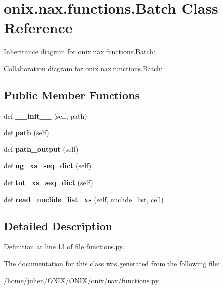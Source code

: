 \hypertarget{classonix_1_1nax_1_1functions_1_1Batch}{}\section{onix.\+nax.\+functions.\+Batch Class Reference}
\label{classonix_1_1nax_1_1functions_1_1Batch}


Inheritance diagram for onix.\+nax.\+functions.\+Batch\+:


Collaboration diagram for onix.\+nax.\+functions.\+Batch\+:
\subsection*{Public Member Functions}
\begin{DoxyCompactItemize}
\item 
\mbox{\label{classonix_1_1nax_1_1functions_1_1Batch_a2a2721defa48518e24878facf886f67f}} 
def {\bfseries \+\_\+\+\_\+init\+\_\+\+\_\+} (self, path)
\item 
\mbox{\label{classonix_1_1nax_1_1functions_1_1Batch_a829a10990e29090bd7cd8485b3ce2eda}} 
def {\bfseries path} (self)
\item 
\mbox{\label{classonix_1_1nax_1_1functions_1_1Batch_aacec11e49b4036af99737872572e4a45}} 
def {\bfseries path\+\_\+output} (self)
\item 
\mbox{\label{classonix_1_1nax_1_1functions_1_1Batch_aca18dd2dcf6c22e79243119543ea36ec}} 
def {\bfseries ng\+\_\+xs\+\_\+seq\+\_\+dict} (self)
\item 
\mbox{\label{classonix_1_1nax_1_1functions_1_1Batch_af8db5813a30a758662f47bc3d6b26116}} 
def {\bfseries tot\+\_\+xs\+\_\+seq\+\_\+dict} (self)
\item 
\mbox{\label{classonix_1_1nax_1_1functions_1_1Batch_ac823f6baced7adea781ae6940b7d22c5}} 
def {\bfseries read\+\_\+nuclide\+\_\+list\+\_\+xs} (self, nuclide\+\_\+list, cell)
\end{DoxyCompactItemize}


\subsection{Detailed Description}


Definition at line 13 of file functions.\+py.



The documentation for this class was generated from the following file\+:\begin{DoxyCompactItemize}
\item 
/home/julien/\+O\+N\+I\+X/\+O\+N\+I\+X/onix/nax/functions.\+py\end{DoxyCompactItemize}

